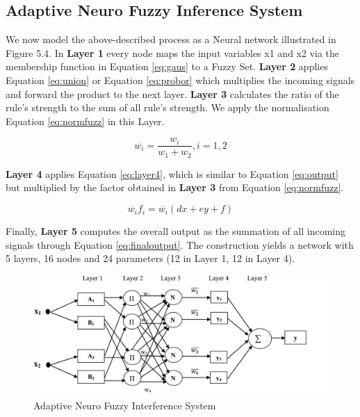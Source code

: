 \subsection{Adaptive Neuro Fuzzy Inference System }

We now model the above-described process as a Neural network illustrated in Figure 5.4.  In \textbf{Layer 1} every node maps the input variables x1 and x2 via the membership function in Equation \ref{eq:gaus} to a Fuzzy Set.  \textbf{Layer 2} applies Equation \ref{eq:union} or Equation \ref{eq:probor} which multiplies the incoming signals and forward the product to the next layer. \textbf {Layer 3} calculates the ratio of the rule's strength to the sum of all rule's strength. We apply the normalisation Equation \ref{eq:normfuzz} in this Layer. 

\begin{equation} \label{eq:normfuzz}
\overline{w_i} =  \frac{w_i}{w_1 + w_2}, i = 1,2 \end{equation}

 \textbf{Layer 4} applies Equation \ref{eq:layer4}, which is similar to Equation \ref{eq:output} but multiplied by the factor obtained in \textbf{Layer 3} from Equation \ref{eq:normfuzz}. 
 
  \begin{equation} \label{eq:layer4}
 \overline{w_i} f_i =  \overline{w_i }(dx + ey + f) \end{equation}
 
 Finally, \textbf{Layer 5} computes the overall output as the summation of all incoming signals through Equation \ref{eq:finaloutput}. The construction yields a network with 5 layers,  16 nodes and 24 parameters (12 in Layer 1, 12 in Layer 4). 
 
 
 
\begin{figure}[H]
        \centering
         \includegraphics[width=1\textwidth ]{img/model/gnn_fuzz}
         \begin{minipage}{\linewidth}
\caption[Caption for LOF]{Adaptive Neuro Fuzzy Interference System\footnotemark}\label{fig:gnn_fuzz}

\end{minipage}      
       
        
\end{figure}

